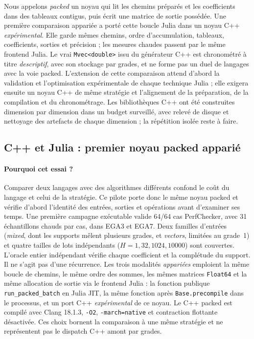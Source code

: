 \documentclass[11pt,a4paper]{article}
\newcommand{\code}[1]{\texttt{#1}}
\begin{document}
Nous appelons \emph{packed} un noyau qui lit les chemins préparés et les
coefficients dans des tableaux contigus, puis écrit une matrice de sortie
possédée. Une première comparaison appariée a porté cette boucle Julia dans
un noyau C++ \emph{expérimental}. Elle garde mêmes chemins, ordre
d'accumulation, tableaux, coefficients, sorties et précision ; les mesures
chaudes passent par le même frontend Julia. Le vrai \code{Mvec<double>} issu
du générateur C++ est chronométré à titre \emph{descriptif}, avec son
stockage par grades, et ne forme pas un duel de langages avec la voie packed.
L'extension de cette comparaison attend d'abord la validation et
l'optimisation expérimentale de chaque technique Julia ; elle exigera
ensuite un noyau C++ de même stratégie et l'alignement de la préparation,
de la compilation et du chronométrage. Les bibliothèques
C++ ont été construites dimension par dimension dans un budget surveillé,
avec relevé de disque et nettoyage des artefacts de chaque dimension ;
la répétition isolée reste à faire.

\subsection{C++ et Julia : premier noyau packed apparié}
\label{sec:cppperf}
\paragraph{Pourquoi cet essai ?}
Comparer deux langages avec des algorithmes différents confond le coût
du langage et celui de la stratégie. Ce pilote porte donc le même noyau
packed et vérifie d'abord l'identité des entrées, sorties et opérations
avant d'examiner ses temps.
Une première campagne exécutable valide 64/64 cas PerfChecker, avec
31 échantillons chauds par cas, dans EGA3 et EGA7. Deux familles d'entrées
(\emph{mixed}, dont les supports mêlent plusieurs grades, et
\emph{vectors}, limitées au grade~1) et quatre tailles de lots indépendants
($H=1,32,1024,10000$) sont couvertes. L'oracle entier indépendant vérifie
chaque coefficient et la complétude du support. Il ne s'agit pas d'une
récurrence. Les trois modalités \emph{appariées} emploient la même boucle
de chemins, le même ordre des sommes, les mêmes matrices \code{Float64}
et la même allocation de sortie via le frontend Julia : la fonction publique
\code{run\_packed\_batch} en Julia JIT, la même fonction après
\code{Base.precompile} dans le processus, et un port C++ \emph{expérimental}
de ce noyau. Le C++ packed est compilé avec Clang 18.1.3,
\code{-O2}, \code{-march=native} et contraction flottante désactivée.
Ces choix bornent la comparaison à une même stratégie
et ne représentent pas le dispatch C++ amont par grades.
\end{document}
